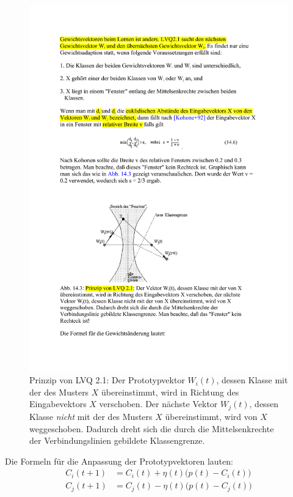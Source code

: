 \begin{figure}[ht!] \centering 
	\includegraphics[width=\linewidth]{figures/ch07_lvq2.pdf}
	\caption{Prinzip von LVQ 2.1: Der Prototypvektor $W_i(t)$, dessen Klasse mit der des Musters $X$ übereinstimmt, wird in Richtung des Eingabevektors $X$ verschoben. Der nächste Vektor $W_j(t)$, dessen Klasse \emph{nicht} mit der des Musters $X$ übereinstimmt, wird von $X$ weggeschoben. Dadurch dreht sich die durch die Mittelsenkrechte der Verbindungslinien gebildete Klassengrenze.}
	\label{fig:ch07_lvq2}
\end{figure}
\noindent
Die Formeln für die Anpassung der Prototypvektoren lauten:
\begin{align*}
	C_i(t+1) &= C_i(t) + \eta(t) \Big( p(t) - C_i(t) \Big) \\
	C_j(t+1) &= C_j(t) - \eta(t) \Big( p(t) - C_j(t) \Big)
\end{align*}

